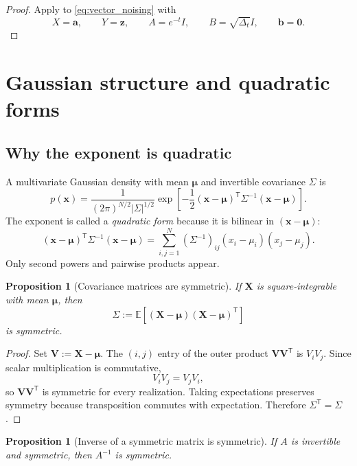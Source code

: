 \documentclass[11pt]{article}
\numberwithin{equation}{section}
\newtheorem{proposition}[theorem]{Proposition}
\theoremstyle{definition}
\theoremstyle{remark}
\newcommand{\E}{\mathbb{E}}
\newcommand{\Id}{I}
\newcommand{\trans}{\mathsf{T}}
\begin{document}
\begin{proof}
Apply  to \eqref{eq:vector_noising} with
\[
X=\mathbf a,\qquad
Y=\mathbf z,\qquad
A=e^{-t}\Id,\qquad
B=\sqrt{\Delta_t}\Id,\qquad
\mathbf b=\mathbf 0.
\]
\end{proof}

\section{Gaussian structure and quadratic forms}\label{sec:quadratic}

\subsection{Why the exponent is quadratic}

A multivariate Gaussian density with mean $\boldsymbol{\mu}$ and invertible covariance $\Sigma$ is
\begin{equation}\label{eq:gaussian_density}
p(\mathbf x)
=
\frac{1}{(2\pi)^{N/2}|\Sigma|^{1/2}}
\exp\!\left[-\frac12(\mathbf x-\boldsymbol{\mu})^\trans\Sigma^{-1}(\mathbf x-\boldsymbol{\mu})\right].
\end{equation}
The exponent is called a \emph{quadratic form} because it is bilinear in $(\mathbf x-\boldsymbol{\mu})$:
\[
(\mathbf x-\boldsymbol{\mu})^\trans\Sigma^{-1}(\mathbf x-\boldsymbol{\mu})
=
\sum_{i,j=1}^N (\Sigma^{-1})_{ij}(x_i-\mu_i)(x_j-\mu_j).
\]
Only second powers and pairwise products appear.

\begin{proposition}[Covariance matrices are symmetric]\label{prop:cov_symmetric}
If $\mathbf X$ is square-integrable with mean $\boldsymbol{\mu}$, then
\[
\Sigma:=\E[(\mathbf X-\boldsymbol{\mu})(\mathbf X-\boldsymbol{\mu})^\trans]
\]
is symmetric.
\end{proposition}

\begin{proof}
Set $\mathbf V:=\mathbf X-\boldsymbol{\mu}$. The $(i,j)$ entry of the outer product $\mathbf V\mathbf V^\trans$ is $V_iV_j$. Since scalar multiplication is commutative,
\[
V_iV_j=V_jV_i,
\]
so $\mathbf V\mathbf V^\trans$ is symmetric for every realization. Taking expectations preserves symmetry because transposition commutes with expectation. Therefore $\Sigma^\trans=\Sigma$.
\end{proof}

\begin{proposition}[Inverse of a symmetric matrix is symmetric]\label{prop:inv_sym}
If $A$ is invertible and symmetric, then $A^{-1}$ is symmetric.
\end{proposition}
\end{document}
